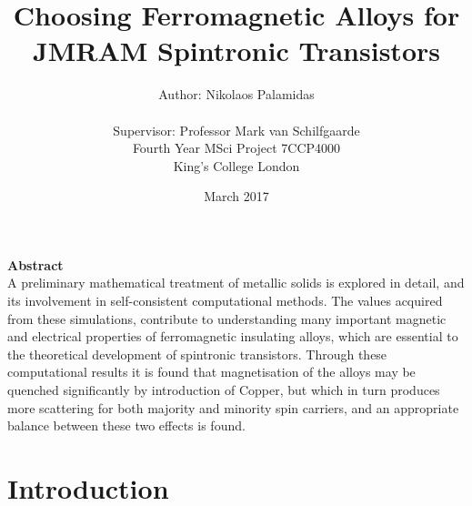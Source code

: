 \documentclass[12pt]{article}
\title{Choosing Ferromagnetic Alloys for JMRAM Spintronic Transistors}
\author{Author: Nikolaos Palamidas \\\\ Supervisor: Professor Mark van Schilfgaarde\\Fourth Year MSci Project 7CCP4000 \\King's College London}
\date{March 2017}
\begin{document}
\maketitle
\clearpage
\thispagestyle{plain}
\begin{center}
    
    \vspace{0.9cm}
    \textbf{Abstract} 
   \\
   A preliminary mathematical treatment of metallic solids is explored in detail, and its involvement in self-consistent computational methods. The values acquired from these simulations, contribute to understanding many important magnetic and electrical properties of ferromagnetic insulating alloys, which are essential to the theoretical development of spintronic transistors. Through these computational results it is found that magnetisation of the alloys may be quenched significantly by introduction of Copper, but which in turn produces more scattering for both majority and minority spin carriers, and an appropriate balance between these two effects is found. 
\end{center}
\clearpage
\tableofcontents
\clearpage

\section{Introduction}
\end{document}
